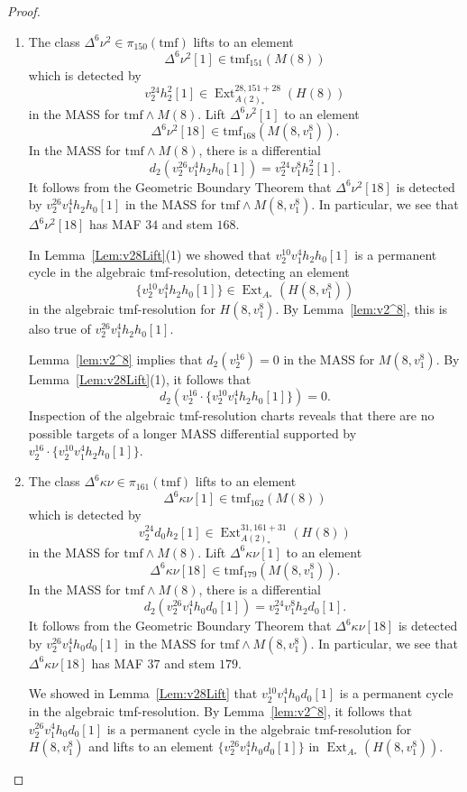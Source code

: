 \documentclass[10pt]{amsart}
\newcommand{\tmf}{\mathrm{tmf}}
\theoremstyle{definition}
\numberwithin{equation}{section}
\numberwithin{figure}{section}
\DeclareMathOperator{\Ext}{Ext}
\begin{document}
\begin{proof}$\quad$
\begin{enumerate}


\item The class $\Delta^6 \nu^2 \in \pi_{150}(\tmf)$ lifts to an element 
$$\Delta^6 \nu^2 [1] \in \tmf_{151}(M(8))$$
which is detected by 
$$v_2^{24} h_2^2[1] \in \Ext^{28,151+28}_{A(2)_*}(H(8))$$ 
in the MASS for $\tmf \wedge M(8)$. Lift $\Delta^6 \nu^2[1]$ to an element 
$$\Delta^6 \nu^2 [18] \in \tmf_{168}(M(8,v_1^8)).$$ 
In the MASS for $\tmf \wedge M(8)$, there is a differential 
$$d_2(v_2^{26} v_1^4 h_2 h_0[1]) = v_2^{24} v_1^8 h_2^2[1].$$ 
It follows from the Geometric Boundary Theorem that $\Delta^6 \nu^2 [18]$ is detected by $v_2^{26} v_1^4 h_2 h_0[1]$ in the MASS for $\tmf \wedge M(8,v_1^8)$. In particular, we see that $\Delta^6 \nu^2 [18]$ has MAF $34$ and stem $168$. 

In Lemma~\ref{Lem:v28Lift}(1) we showed that $v_2^{10} v_1^4 h_2 h_0[1]$ is a permanent cycle in the algebraic tmf-resolution, detecting an element
$$ \{v_2^{10} v_1^4 h_2 h_0[1]\} \in \Ext_{A_*}(H(8,v_1^8)) $$
in the algebraic tmf-resolution for $H(8,v_1^8)$.
By Lemma~\ref{lem:v2^8}, this is also true of $v_2^{26} v_1^4 h_2 h_0[1]$.

Lemma~\ref{lem:v2^8} implies that $d_2(v_2^{16}) = 0$ in the MASS for $M(8,v_1^8)$.  By Lemma~\ref{Lem:v28Lift}(1), it follows that
$$ d_2(v_2^{16} \cdot \{v_2^{10} v_1^4 h_2 h_0[1]\}) = 0. $$
Inspection of the algebraic tmf-resolution charts reveals that there are no possible targets of a longer MASS differential supported by $v_2^{16} \cdot \{v_2^{10} v_1^4 h_2 h_0[1]\}$.
\vspace{10pt}

\item The class $\Delta^6 \kappa \nu \in \pi_{161}(\tmf)$ lifts to an element 
$$\Delta^6 \kappa \nu[1] \in \tmf_{162}(M(8))$$ 
which is detected by 
$$v_2^{24} d_0 h_2[1] \in \Ext^{31,161+31}_{A(2)_*}(H(8))$$ 
in the MASS for $\tmf \wedge M(8)$. Lift $\Delta^6 \kappa \nu[1]$ to an element 
$$\Delta^6 \kappa \nu[18] \in \tmf_{179}(M(8,v_1^8)).$$ 
In the MASS for $\tmf \wedge M(8)$, there is a differential 
$$d_2(v_2^{26} v_1^4 h_0 d_0[1]) = v_2^{24} v_1^8 h_2 d_0[1].$$
It follows from the Geometric Boundary Theorem that $\Delta^6 \kappa \nu[18]$ is detected by $v_2^{26} v_1^4 h_0 d_0[1]$ in the MASS for $\tmf \wedge M(8,v_1^8)$. In particular, we see that $\Delta^6 \kappa \nu[18]$ has MAF $37$ and stem $179$. 

We showed in Lemma~\ref{Lem:v28Lift} that $v_2^{10}v_1^4 h_0 d_0[1]$ is a permanent cycle in the algebraic tmf-resolution.  By Lemma~\ref{lem:v2^8}, it follows that $v_2^{26} v_1^4 h_0 d_0[1]$ is a permanent cycle in the algebraic $\tmf$-resolution for $H(8,v_1^8)$ and lifts to an element $\{v_2^{26} v_1^4 h_0 d_0[1]\}$ in $\Ext_{A_*}(H(8,v_1^8))$. 


\end{enumerate}
\end{proof}
\end{document}
